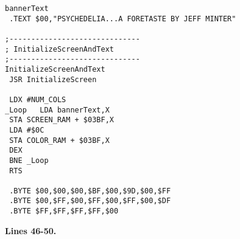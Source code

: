 \begin{minipage}[b]{0.33\linewidth}
\begin{lrbox}{\mybox}
\begin{lstlisting}[basicstyle=\ttfamily\tiny]
bannerText   
 .TEXT $00,"PSYCHEDELIA...A FORETASTE BY JEFF MINTER"

;------------------------------
; InitializeScreenAndText
;------------------------------
InitializeScreenAndText   
 JSR InitializeScreen

 LDX #NUM_COLS
_Loop   LDA bannerText,X
 STA SCREEN_RAM + $03BF,X
 LDA #$0C
 STA COLOR_RAM + $03BF,X
 DEX 
 BNE _Loop
 RTS 

 .BYTE $00,$00,$00,$BF,$00,$9D,$00,$FF
 .BYTE $00,$FF,$00,$FF,$00,$FF,$00,$DF
 .BYTE $FF,$FF,$FF,$FF,$00

\end{lstlisting}
\end{lrbox}%
\scalebox{0.8}{\usebox{\mybox}}
\end{minipage}
\clearpage
\textbf{Lines 46-50. }

\clearpage

